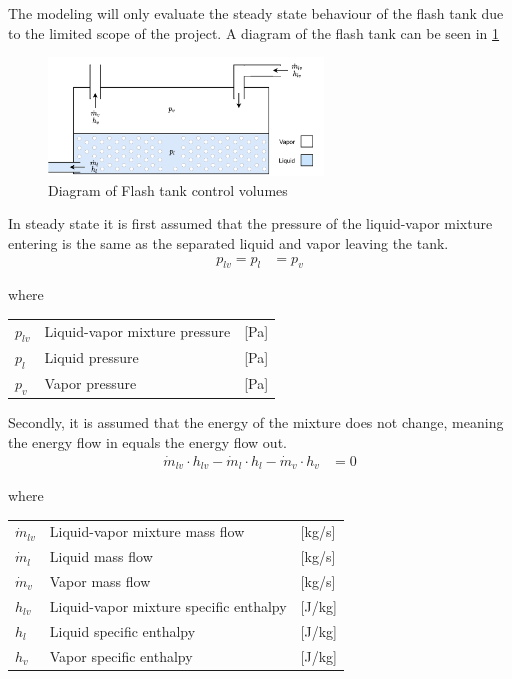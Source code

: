 The modeling will only evaluate the steady state behaviour of the flash tank due to the limited scope of the project. A diagram of the flash tank can be seen in \cref{fig:flash_tank_CV}

\begin{figure}[h!]
	\centering
	\includegraphics[width=0.65\textwidth]{Graphics/Flash_tank.pdf}
	\caption{Diagram of Flash tank control volumes}
	\label{fig:flash_tank_CV}
\end{figure}

In steady state it is first assumed that the pressure of the liquid-vapor mixture entering is the same as the separated liquid and vapor leaving the tank.
\begin{align}
	p_{lv} 	= p_{l}					&  = p_{v}
	\label{eq:Flash_tank_pressure}
\end{align}

where

\begin{center}
	\begin{tabular}{l p{8cm} l}
		$p_{lv}$				&  Liquid-vapor mixture pressure		& [\si{Pa}]\\
		$p_{l}$					&  Liquid pressure 						& [\si{Pa}] \\
		$p_{v}$					&  Vapor pressure						& [\si{Pa}]\\

	\end{tabular}
\end{center}


Secondly, it is assumed that the energy of the mixture does not change, meaning the energy flow in equals the energy flow out.
\begin{align}
	\dot{m}_{lv} \cdot  h_{lv}  - \dot{m}_{l} \cdot  h_{l} - \dot{m}_{v} \cdot  h_{v} & = 0
	\label{eq:Flash_tank_energyflow}
\end{align}

where

\begin{center}
	\begin{tabular}{l p{8cm} l}
		$\dot{m}_{lv}$			&  Liquid-vapor mixture mass flow			& [\si{kg}/\si{s}]\\
		$\dot{m}_{l}$			&  Liquid mass flow 						& [\si{kg}/\si{s}] \\
		$\dot{m}_{v}$			&  Vapor mass flow							& [\si{kg}/\si{s}]\\
		$h_{lv}$				&  Liquid-vapor mixture specific enthalpy	& [\si{J}/\si{kg}]\\
		$h_{l}$					&  Liquid specific enthalpy 				& [\si{J}/\si{kg}] \\
		$h_{v}$					&  Vapor specific enthalpy					& [\si{J}/\si{kg}]\\

	\end{tabular}
\end{center}


